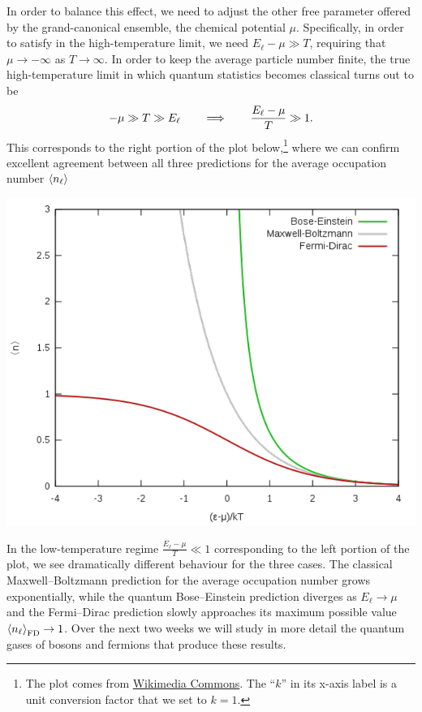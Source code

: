 In order to balance this effect, we need to adjust the other free parameter offered by the grand-canonical ensemble, the chemical potential $\mu$.
Specifically, in order to satisfy  in the high-temperature limit, we need $E_{\ell} - \mu \gg T$, requiring that $\mu \to -\infty$ as $T \to \infty$.
In order to keep the average particle number finite, the true high-temperature limit in which quantum statistics becomes classical turns out to be
\begin{equation}
  -\mu \gg T \gg E_{\ell} \qquad \Longrightarrow \qquad \frac{E_{\ell} - \mu}{T} \gg 1.
\end{equation}
This corresponds to the right portion of the plot below,\footnote{The plot comes from \href{https://commons.wikimedia.org/wiki/File:Fermi-Dirac_Bose-Einstein_Maxwell-Boltzmann_statistics.svg}{Wikimedia Commons}.  The ``$k$'' in its x-axis label is a unit conversion factor that we set to $k = 1$.} where we can confirm excellent agreement between all three predictions for the average occupation number $\left\langle n_{\ell} \right\rangle$

\begin{center}
  \includegraphics[width=\textwidth]{figs/week07_dist.pdf}
\end{center}

In the low-temperature regime $\frac{E_{\ell} - \mu}{T} \ll 1$ corresponding to the left portion of the plot, we see dramatically different behaviour for the three cases.
The classical Maxwell--Boltzmann prediction for the average occupation number grows exponentially, while the quantum Bose--Einstein prediction diverges as $E_{\ell} \to \mu$ and the Fermi--Dirac prediction slowly approaches its maximum possible value $\left\langle n_{\ell} \right\rangle_{\text{FD}} \to 1$.
Over the next two weeks we will study in more detail the quantum gases of bosons and fermions that produce these results.
